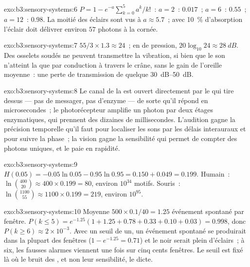 \begin{solution}{exo:b3:sensory-systems:6}
$P = 1 - e^{-a}\sum_{k=0}^{5}a^{k}/k!$~: $a = 2$~: $0.017$~; $a = 6$~:
$0.55$~; $a = 12$~: $0.98$. La moitié des éclairs sont vus à
$a \approx 5.7$~; avec \qty{10}{\%} d'absorption l'éclair doit délivrer
environ $57$ photons à la cornée.
\end{solution}

\begin{solution}{exo:b3:sensory-systems:7}
$55/3\times 1.3 \approx 24$~; en  de pression, $20\log_{10}24
\approx \qty{28}{dB}$. Des osselets soudés ne peuvent transmettre la
vibration, si bien que le son n'atteint la  que par conduction à
travers le crâne, sans le gain de l'oreille moyenne~: une perte de
transmission de quelque \qtyrange{30}{50}{dB}.
\end{solution}

\begin{solution}{exo:b3:sensory-systems:8}
Le canal de la  est ouvert directement par le 
qui tire dessus --- pas de messager, pas d'enzyme --- de sorte qu'il
répond en microsecondes~; le photorécepteur amplifie un photon par deux
étages enzymatiques, qui prennent des dizaines de millisecondes.
L'audition gagne la précision temporelle qu'il faut pour localiser les
sons par les délais interauraux et pour suivre la phase~; la vision
gagne la sensibilité qui permet de compter des photons uniques, et le
paie en rapidité.
\end{solution}

\begin{solution}{exo:b3:sensory-systems:9}
$H(0.05) = -0.05\ln 0.05 - 0.95\ln 0.95 = 0.150 + 0.049 = 0.199$.
Humain~: $\ln\binom{400}{20} \approx 400\times 0.199 = 80$, environ
$10^{34}$ motifs. Souris~: $\ln\binom{1100}{55} \approx 1100\times 0.199
= 219$, environ $10^{95}$.
\end{solution}

\begin{solution}{exo:b3:sensory-systems:10}
Moyenne $500\times 0.1/40 = 1.25$ événement spontané par fenêtre. $P(k
\le 5) = e^{-1.25}(1 + 1.25 + 0.78 + 0.33 + 0.10 + 0.03) = 0.998$, donc
$P(k \ge 6) \approx 2\times 10^{-3}$. Avec un seuil de un, un événement
spontané se produirait dans la plupart des fenêtres
($1 - e^{-1.25} = 0.71$) et le noir serait plein d'éclairs~; à six, les
fausses alarmes viennent une fois sur cinq cents fenêtres. Le seuil est
fixé là où le bruit des , et non leur sensibilité, le dicte.
\end{solution}

